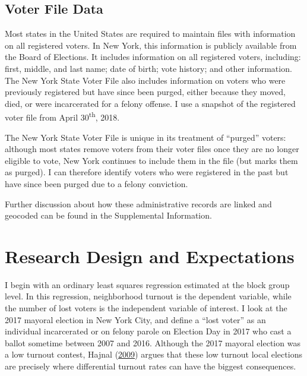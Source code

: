 \documentclass[
  12pt,
]{article}
\begin{document}
\hypertarget{voter-file-data}{%
\subsection*{Voter File Data}\label{voter-file-data}}

Most states in the United States are required to maintain files with information on all registered voters. In New York, this information is publicly available from the Board of Elections. It includes information on all registered voters, including: first, middle, and last name; date of birth; vote history; and other information. The New York State Voter File also includes information on voters who were previously registered but have since been purged, either because they moved, died, or were incarcerated for a felony offense. I use a snapshot of the registered voter file from April 30\textsuperscript{th}, 2018.

The New York State Voter File is unique in its treatment of ``purged'' voters: although most states remove voters from their voter files once they are no longer eligible to vote, New York continues to include them in the file (but marks them as purged). I can therefore identify voters who were registered in the past but have since been purged due to a felony conviction.

Further discussion about how these administrative records are linked and geocoded can be found in the Supplemental Information.

\hypertarget{research-design-and-expectations}{%
\section*{Research Design and Expectations}\label{research-design-and-expectations}}

I begin with an ordinary least squares regression estimated at the block group level. In this regression, neighborhood turnout is the dependent variable, while the number of lost voters is the independent variable of interest. I look at the 2017 mayoral election in New York City, and define a ``lost voter'' as an individual incarcerated or on felony parole on Election Day in 2017 who cast a ballot sometime between 2007 and 2016. Although the 2017 mayoral election was a low turnout contest, Hajnal (\protect\hyperlink{ref-Hajnal2009}{2009}) argues that these low turnout local elections are precisely where differential turnout rates can have the biggest consequences.
\end{document}
